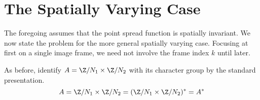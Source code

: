 
\section{The Spatially Varying Case}\label{sec:spat-vary-case}
The foregoing assumes that the point spread function is spatially invariant.
We now state the problem for the more general spatially varying case.
Focusing at first on a single image frame, we need not involve the frame index $k$ 
until later.  

As before, identify $A = \Z/N_1 \times \Z/N_2$ with its character group by the
standard presentation.
\[
A = \Z/N_1 \times \Z/N_2 = 
(\Z/N_1 \times \Z/N_2)^* = A^*
\]

